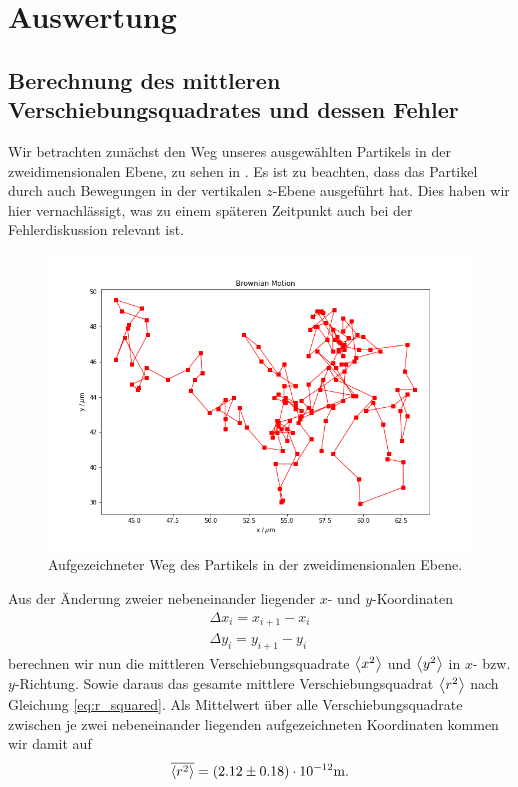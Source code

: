 \section{Auswertung}

\subsection{Berechnung des mittleren Verschiebungsquadrates und dessen Fehler}

Wir betrachten zunächst den Weg unseres ausgewählten Partikels in der zweidimensionalen Ebene, zu sehen in . Es ist zu beachten, dass das Partikel durch auch Bewegungen in der vertikalen $z$-Ebene ausgeführt hat. Dies haben wir hier vernachlässigt, was zu einem späteren Zeitpunkt auch bei der Fehlerdiskussion relevant ist.


\begin{figure}[H]
  \centering
  \includegraphics[width=.90\textwidth]{files/brown1.png}
  \caption{Aufgezeichneter Weg des Partikels in der zweidimensionalen Ebene.}
  \label{fig:brown1}
\end{figure}

Aus der Änderung zweier nebeneinander liegender $x$- und $y$-Koordinaten
\begin{gather}
  \Delta x_i = x_{i+1} - x_i\\
  \Delta y_i = y_{i+1} - y_i
\end{gather}
berechnen wir nun die mittleren Verschiebungsquadrate $\expval{x^2}$ und $\expval{y^2}$ in $x$- bzw. $y$-Richtung. Sowie daraus das gesamte mittlere Verschiebungsquadrat $\expval{r^2}$ nach Gleichung \eqref{eq:r_squared}. Als Mittelwert über alle Verschiebungsquadrate zwischen je zwei nebeneinander liegenden aufgezeichneten Koordinaten kommen wir damit auf
\begin{align}
  \overline{\expval{r^2}} = (2.12 \pm 0.18) \cdot 10^{-12} \si{\meter}.
\end{align}

